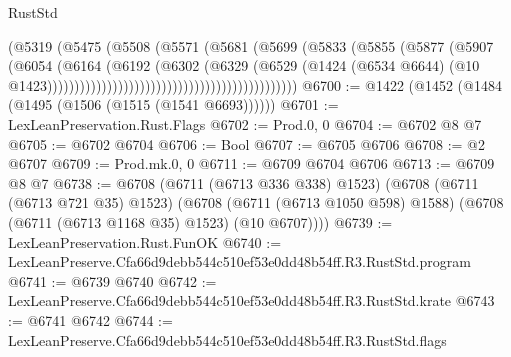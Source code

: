 \begin{lexlean}{RustStd}
\begin{coremodule}
                                                            (@5319
                                                              (@5475
                                                                (@5508
                                                                  (@5571
                                                                    (@5681
                                                                      (@5699
                                                                        (@5833
                                                                          (@5855
                                                                            (@5877
                                                                              (@5907
                                                                                (@6054
                                                                                  (@6164
                                                                                    (@6192
                                                                                      (@6302
                                                                                        (@6329
                                                                                          (@6529
                                                                                            (@1424
                                                                                              (@6534
                                                                                                @6644)
                                                                                              (@10
                                                                                                @1423))))))))))))))))))))))))))))))))))))))))))))))
@6700 := @1422 (@1452 (@1484 (@1495 (@1506 (@1515 (@1541 @6693))))))
@6701 := LexLeanPreservation.Rust.Flags
@6702 := Prod.{0, 0}
@6704 := @6702 @8 @7
@6705 := @6702 @6704
@6706 := Bool
@6707 := @6705 @6706
@6708 := @2 @6707
@6709 := Prod.mk.{0, 0}
@6711 := @6709 @6704 @6706
@6713 := @6709 @8 @7
@6738 := @6708
    (@6711 (@6713 @336 @338) @1523)
    (@6708
      (@6711 (@6713 @721 @35) @1523)
      (@6708 (@6711 (@6713 @1050 @598) @1588) (@6708 (@6711 (@6713 @1168 @35) @1523) (@10 @6707))))
@6739 := LexLeanPreservation.Rust.FunOK
@6740 := LexLeanPreserve.Cfa66d9debb544c510ef53e0dd48b54ff.R3.RustStd.program
@6741 := @6739 @6740
@6742 := LexLeanPreserve.Cfa66d9debb544c510ef53e0dd48b54ff.R3.RustStd.krate
@6743 := @6741 @6742
@6744 := LexLeanPreserve.Cfa66d9debb544c510ef53e0dd48b54ff.R3.RustStd.flags

\end{coremodule}
\end{lexlean}
